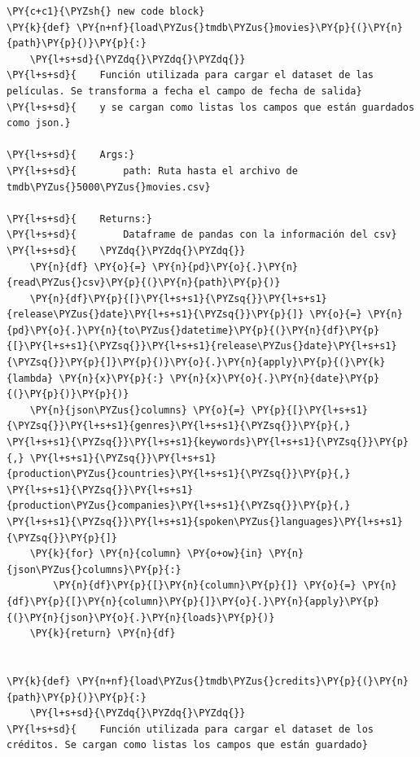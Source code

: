    \begin{tcolorbox}[breakable, size=fbox, boxrule=1pt, pad at break*=1mm,colback=cellbackground, colframe=cellborder]
\begin{Verbatim}[commandchars=\\\{\}]
\PY{c+c1}{\PYZsh{} new code block}
\PY{k}{def} \PY{n+nf}{load\PYZus{}tmdb\PYZus{}movies}\PY{p}{(}\PY{n}{path}\PY{p}{)}\PY{p}{:}
    \PY{l+s+sd}{\PYZdq{}\PYZdq{}\PYZdq{}}
\PY{l+s+sd}{    Función utilizada para cargar el dataset de las películas. Se transforma a fecha el campo de fecha de salida}
\PY{l+s+sd}{    y se cargan como listas los campos que están guardados como json.}

\PY{l+s+sd}{    Args:}
\PY{l+s+sd}{        path: Ruta hasta el archivo de tmdb\PYZus{}5000\PYZus{}movies.csv}

\PY{l+s+sd}{    Returns:}
\PY{l+s+sd}{        Dataframe de pandas con la información del csv}
\PY{l+s+sd}{    \PYZdq{}\PYZdq{}\PYZdq{}}
    \PY{n}{df} \PY{o}{=} \PY{n}{pd}\PY{o}{.}\PY{n}{read\PYZus{}csv}\PY{p}{(}\PY{n}{path}\PY{p}{)}
    \PY{n}{df}\PY{p}{[}\PY{l+s+s1}{\PYZsq{}}\PY{l+s+s1}{release\PYZus{}date}\PY{l+s+s1}{\PYZsq{}}\PY{p}{]} \PY{o}{=} \PY{n}{pd}\PY{o}{.}\PY{n}{to\PYZus{}datetime}\PY{p}{(}\PY{n}{df}\PY{p}{[}\PY{l+s+s1}{\PYZsq{}}\PY{l+s+s1}{release\PYZus{}date}\PY{l+s+s1}{\PYZsq{}}\PY{p}{]}\PY{p}{)}\PY{o}{.}\PY{n}{apply}\PY{p}{(}\PY{k}{lambda} \PY{n}{x}\PY{p}{:} \PY{n}{x}\PY{o}{.}\PY{n}{date}\PY{p}{(}\PY{p}{)}\PY{p}{)}
    \PY{n}{json\PYZus{}columns} \PY{o}{=} \PY{p}{[}\PY{l+s+s1}{\PYZsq{}}\PY{l+s+s1}{genres}\PY{l+s+s1}{\PYZsq{}}\PY{p}{,} \PY{l+s+s1}{\PYZsq{}}\PY{l+s+s1}{keywords}\PY{l+s+s1}{\PYZsq{}}\PY{p}{,} \PY{l+s+s1}{\PYZsq{}}\PY{l+s+s1}{production\PYZus{}countries}\PY{l+s+s1}{\PYZsq{}}\PY{p}{,} \PY{l+s+s1}{\PYZsq{}}\PY{l+s+s1}{production\PYZus{}companies}\PY{l+s+s1}{\PYZsq{}}\PY{p}{,} \PY{l+s+s1}{\PYZsq{}}\PY{l+s+s1}{spoken\PYZus{}languages}\PY{l+s+s1}{\PYZsq{}}\PY{p}{]}
    \PY{k}{for} \PY{n}{column} \PY{o+ow}{in} \PY{n}{json\PYZus{}columns}\PY{p}{:}
        \PY{n}{df}\PY{p}{[}\PY{n}{column}\PY{p}{]} \PY{o}{=} \PY{n}{df}\PY{p}{[}\PY{n}{column}\PY{p}{]}\PY{o}{.}\PY{n}{apply}\PY{p}{(}\PY{n}{json}\PY{o}{.}\PY{n}{loads}\PY{p}{)}
    \PY{k}{return} \PY{n}{df}


\PY{k}{def} \PY{n+nf}{load\PYZus{}tmdb\PYZus{}credits}\PY{p}{(}\PY{n}{path}\PY{p}{)}\PY{p}{:}
    \PY{l+s+sd}{\PYZdq{}\PYZdq{}\PYZdq{}}
\PY{l+s+sd}{    Función utilizada para cargar el dataset de los créditos. Se cargan como listas los campos que están guardado}


\end{Verbatim}
\end{tcolorbox}
